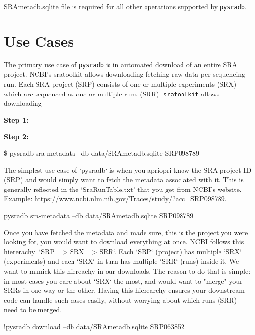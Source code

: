 \documentclass[9pt,a4paper]{extarticle}
\newenvironment{allintypewriter}{\ttfamily}{\par}
\begin{document}
SRAmetadb.sqlite file is required for all other operations supported
by \texttt{pysradb}.


\section*{Use Cases} %
The primary use case of \texttt{pysradb} is in automated download of an entire SRA project. NCBI's sratoolkit \cite{ncbisratoolit} allows
downloading fetching raw data per sequencing run. Each SRA project (SRP) consists of one or multiple experiments (SRX) which are sequenced as one or multiple runs (SRR). \texttt{sratoolkit} allows downloading 


\textbf{Step 1: }


\textbf{Step 2:}

\begin{allintypewriter}
\$ pysradb sra-metadata --db data/SRAmetadb.sqlite SRP098789 


\end{allintypewriter}

The simplest use case of `pysradb` is when you apriopri know the SRA project ID (SRP)
and would simply want to fetch the metadata associated with it. This is generally
reflected in the `SraRunTable.txt' that you get from NCBI's website.
Example: https://www.ncbi.nlm.nih.gov/Traces/study/?acc=SRP098789.


\begin{allintypewriter}
pysradb sra-metadata --db data/SRAmetadb.sqlite SRP098789
\end{allintypewriter}


Once you have fetched the metadata and made sure, this is the project
you were looking for, you would want to download everything at once.
NCBI follows this hiererachy: `SRP => SRX => SRR`. Each `SRP` (project) has multiple
`SRX` (experiments) and each `SRX` in turn has multiple `SRR` (runs) inside it.
We want to mimick this hiereachy in our downloads. The reason to do that is simple:
in most cases you care about `SRX` the most, and would want to "merge" your SRRs
in one way or the other. Having this hierearchy ensures your downstream code
can handle such cases easily, without worrying about which runs (SRR) need to be merged.


\begin{allintypewriter}
!pysradb download --db data/SRAmetadb.sqlite SRP063852 
\end{allintypewriter}
\end{document}
